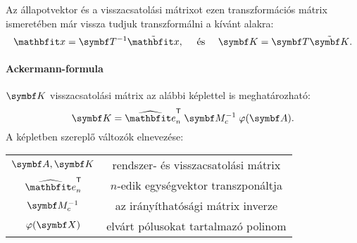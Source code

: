 Az állapotvektor és a visszacsatolási mátrixot ezen transzformációs mátrix
ismeretében már vissza tudjuk transzformálni a kívánt alakra:
\begin{equation}
  \rvec x = \rmat T^{-1} \tvec x,
  \quad \text{ és } \quad
  \rmat K = \rmat T \tmat K.
  \label{eq:T-back}
\end{equation}

\paragraph{Ackermann-formula}

$\rmat K$ visszacsatolási mátrix az alábbi képlettel is meghatározható:
\begin{equation}
  \rmat K
  = \uvec e_n^\T
  \;\rmat M_c^{-1}
  \;\varphi(\rmat A)
  .
  \label{eq:Acker-K}
\end{equation}
A képletben szereplő változók elnevezése:
\bgroup
\def\arraystretch{1.2}
\begin{center}
  \begin{tabular}{ | c c | }
    \hline
    $\rmat A, \rmat K$ & rendszer- és visszacsatolási mátrix  \\
    $\uvec e_n^\T$     & $n$-edik egységvektor transzponáltja \\
    $\rmat M_c^{-1}$   & az irányíthatósági mátrix inverze    \\
    $\varphi(\rmat X)$ & elvárt pólusokat tartalmazó polinom  \\
    \hline
  \end{tabular}
\end{center}
\egroup

